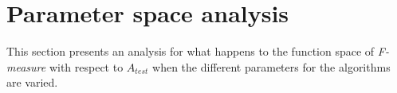 

\section{Parameter space analysis}\label{sec:parameters}

This section presents an analysis for what happens to the function space of \textit{F-measure} with respect to $A_{test}$ when the different parameters for the algorithms are varied.


\newpage


\newpage

